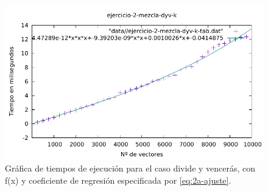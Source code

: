 \begin{figure}[h]
    \centering
    \includegraphics[scale=0.76]{img/e2-dyv-k.pdf}
    \caption{Gráfica de tiempos de ejecución para el caso divide y vencerás, 
    con f(x) y coeficiente de regresión especificada por \ref{eq:2a-ajuste}.}
    \label{fig:2a-obvio-n-graph}
\end{figure}